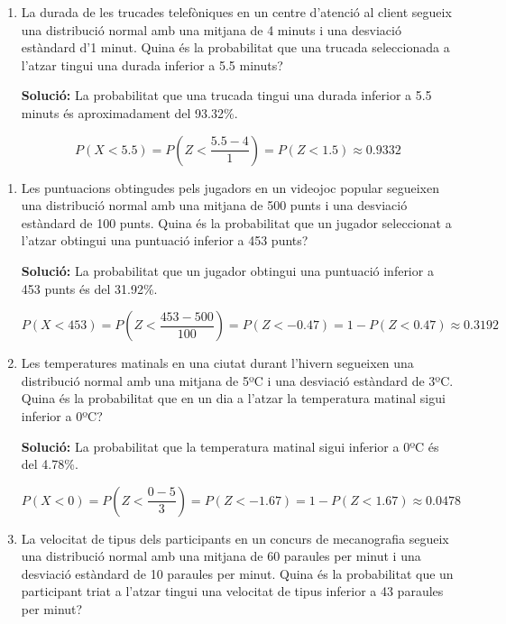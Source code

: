 \documentclass[12pt]{article}
\begin{document}
\begin{exemple}
\begin{enumerate}
    \item La durada de les trucades telefòniques en un centre d'atenció al client segueix una distribució normal amb una mitjana de 4 minuts i una desviació estàndard d'1 minut. Quina és la probabilitat que una trucada seleccionada a l'atzar tingui una durada inferior a 5.5 minuts?
    
    \textbf{Solució:} La probabilitat que una trucada tingui una durada inferior a 5.5 minuts és aproximadament del 93.32\%.
    
    \[
    P(X < 5.5) = P\left(Z< \frac{5.5 - 4}{1} \right) = P(Z< 1.5) \approx 0.9332
    \]
\end{enumerate}
\end{exemple}

\begin{exemple}[title=]
    
\begin{enumerate}[start=6]

   \item Les puntuacions obtingudes pels jugadors en un videojoc popular segueixen una distribució normal amb una mitjana de 500 punts i una desviació estàndard de 100 punts. Quina és la probabilitat que un jugador seleccionat a l'atzar obtingui una puntuació inferior a 453 punts?
    
    \textbf{Solució:} La probabilitat que un jugador obtingui una puntuació inferior a 453 punts és del 31.92\%.
    
    \[
    P(X < 453) = P\left(Z< \frac{453 - 500}{100} \right) = P(Z< -0.47) = 1 - P(Z< 0.47) \approx 0.3192
    \]

    \item Les temperatures matinals en una ciutat durant l'hivern segueixen una distribució normal amb una mitjana de 5ºC i una desviació estàndard de 3ºC. Quina és la probabilitat que en un dia a l'atzar la temperatura matinal sigui inferior a 0ºC?
    
    \textbf{Solució:} La probabilitat que la temperatura matinal sigui inferior a 0ºC és del 4.78\%.
    
    \[
    P(X < 0) = P\left(Z< \frac{0 - 5}{3} \right) = P(Z< -1.67) = 1 - P(Z< 1.67) \approx 0.0478
    \]

    \item La velocitat de tipus dels participants en un concurs de mecanografia segueix una distribució normal amb una mitjana de 60 paraules per minut i una desviació estàndard de 10 paraules per minut. Quina és la probabilitat que un participant triat a l'atzar tingui una velocitat de tipus inferior a 43 paraules per minut?
    

\end{enumerate}
\end{exemple}
\end{document}
